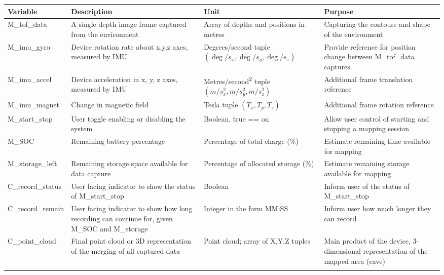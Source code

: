 \documentclass[11pt]{article}
\begin{document}
		\begin{tabularx}{\textwidth}{p{}  X  X  X}
			\toprule
			\textbf{Variable} & \textbf{Description} & \textbf{Unit} & \textbf{Purpose} \\
			\midrule
			M\_tof\_data & A single depth image frame captured from the environment  & Array of depths and positions in metres  & Capturing the contours and shape of the environment \\
			\midrule
			M\_imu\_gyro & Device rotation rate about x,y,z axes, measured by IMU  & Degrees/second tuple $(\deg/s_{x},\deg/s_{y},\deg/s_{z})$ & Provide reference for position change between M\_tof\_data captures  \\
			\midrule
			M\_imu\_accel & Device acceleration in x, y, z axes, measured by IMU & Metres/second\textsuperscript{2} tuple $(m/s^{2}_{x},m/s^{2}_{y},m/s^{2}_{z})$ & Additional frame translation reference  \\
			\midrule
			M\_imu\_magnet & Change in magnetic field  & Tesla tuple $(T_{x},T_{y},T_{z})$  & Additional frame rotation reference \\
			\midrule
			M\_start\_stop & User toggle enabling or disabling the system & Boolean, true == on & Allow user control of starting and stopping a mapping session \\
			\midrule
			M\_SOC & Remaining battery percentage & Percentage of total charge (\%) & Estimate remaining time available for mapping \\
			\midrule
			M\_storage\_left & Remaining storage space available for data capture & Percentage of allocated storage (\%)& Estimate remaining storage available for mapping \\
			\midrule
			C\_record\_status & User facing indicator to show the status of M\_start\_stop & Boolean & Inform user of the status of M\_start\_stop \\
			\midrule
			C\_record\_remain & User facing indicator to show how long recording can continue for, given M\_SOC and M\_storage & Integer in the form MM:SS & Inform user how much longer they can record \\
			\midrule
			C\_point\_cloud & Final point cloud or 3D representation of the merging of all captured data & Point cloud; array of X,Y,Z tuples & Main product of the device, 3-dimensional representation of the mapped area (cave)\\
			\bottomrule
			\caption{Variables and its Description}
		\end{tabularx}
\end{document}
